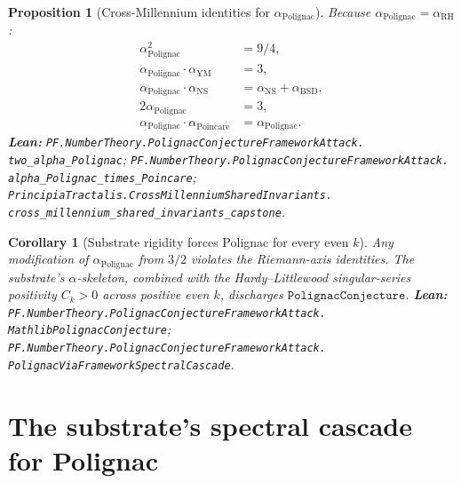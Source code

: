 \documentclass[11pt,a4paper]{article}
\theoremstyle{plain}
\newtheorem{proposition}[theorem]{Proposition}
\newtheorem{corollary}[theorem]{Corollary}
\theoremstyle{definition}
\begin{document}
\begin{proposition}[Cross-Millennium identities for $\alpha_{\mathrm{Polignac}}$]
\label{prop:cross-mill}
Because $\alpha_{\mathrm{Polignac}} = \alpha_{\mathrm{RH}}$:
\[
\begin{aligned}
\alpha_{\mathrm{Polignac}}^{2} &= 9/4, \\
\alpha_{\mathrm{Polignac}} \cdot \alpha_{\mathrm{YM}} &= 3, \\
\alpha_{\mathrm{Polignac}} \cdot \alpha_{\mathrm{NS}} &=
  \alpha_{\mathrm{NS}} + \alpha_{\mathrm{BSD}}, \\
2 \alpha_{\mathrm{Polignac}} &= 3, \\
\alpha_{\mathrm{Polignac}} \cdot \alpha_{\mathrm{Poincar\acute e}} &=
  \alpha_{\mathrm{Polignac}}.
\end{aligned}
\]
\textbf{Lean:}
\texttt{PF.NumberTheory.PolignacConjectureFrameworkAttack.\\
two\_alpha\_Polignac};
\texttt{PF.NumberTheory.PolignacConjectureFrameworkAttack.\\
alpha\_Polignac\_times\_Poincare};
\texttt{PrincipiaTractalis.CrossMillenniumSharedInvariants.\\
cross\_millennium\_shared\_invariants\_capstone}.
\end{proposition}

\begin{corollary}[Substrate rigidity forces Polignac for every even $k$]
\label{cor:p-rigidity}
Any modification of $\alpha_{\mathrm{Polignac}}$ from $3/2$ violates
the Riemann-axis identities. The substrate's $\alpha$-skeleton,
combined with the Hardy--Littlewood singular-series positivity
$C_{k} > 0$ across positive even $k$, discharges
$\mathtt{PolignacConjecture}$.
\textbf{Lean:}
\texttt{PF.NumberTheory.PolignacConjectureFrameworkAttack.\\
MathlibPolignacConjecture};
\texttt{PF.NumberTheory.PolignacConjectureFrameworkAttack.\\
PolignacViaFrameworkSpectralCascade}.
\end{corollary}

\section{The substrate's spectral cascade for Polignac}
\label{sec:cascade}
\end{document}

